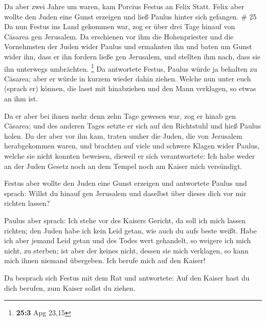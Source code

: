  Da aber zwei Jahre um waren, kam Porcius Festus an Felix
Statt. Felix aber wollte den Juden eine Gunst erzeigen und ließ Paulus
hinter sich gefangen. \# 25  Da nun Festus ins Land gekommen
war, zog er über drei Tage hinauf von Cäsarea gen Jerusalem.
 Da erschienen vor ihm die Hohenpriester und die Vornehmsten
der Juden wider Paulus und ermahnten ihn  und baten um Gunst
wider ihn, dass er ihn fordern ließe gen Jerusalem, und stellten ihm
nach, dass sie ihn unterwegs umbrächten. \footnote{\textbf{25:3} Apg
  23,15}  Da antwortete Festus, Paulus würde ja behalten zu
Cäsarea; aber er würde in kurzem wieder dahin ziehen. 
Welche nun unter euch (sprach er) können, die lasst mit hinabziehen und
den Mann verklagen, so etwas an ihm ist.

 Da er aber bei ihnen mehr denn zehn Tage gewesen war, zog
er hinab gen Cäsarea; und des anderen Tages setzte er sich auf den
Richtstuhl und hieß Paulus holen.  Da der aber vor ihn kam,
traten umher die Juden, die von Jerusalem herabgekommen waren, und
brachten auf viele und schwere Klagen wider Paulus, welche sie nicht
konnten beweisen,  dieweil er sich verantwortete: Ich habe
weder an der Juden Gesetz noch an dem Tempel noch am Kaiser mich
versündigt.

 Festus aber wollte den Juden eine Gunst erzeigen und
antwortete Paulus und sprach: Willst du hinauf gen Jerusalem und
daselbst über dieses dich vor mir richten lassen?

 Paulus aber sprach: Ich stehe vor des Kaisers Gericht, da
soll ich mich lassen richten; den Juden habe ich kein Leid getan, wie
auch du aufs beste weißt.  Habe ich aber jemand Leid getan
und des Todes wert gehandelt, so weigere ich mich nicht, zu sterben; ist
aber der keines nicht, dessen sie mich verklagen, so kann mich ihnen
niemand übergeben. Ich berufe mich auf den Kaiser!

 Da besprach sich Festus mit dem Rat und antwortete: Auf
den Kaiser hast du dich berufen, zum Kaiser sollst du ziehen.

